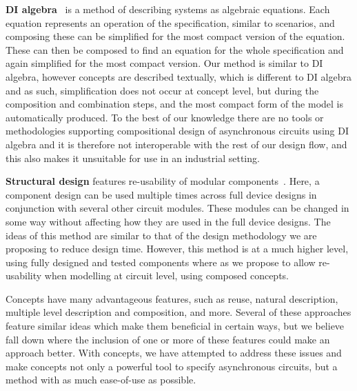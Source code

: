 \documentclass[british,compsoc]{IEEEtran}
\begin{document}
\textbf{DI algebra}~\cite{josephs1993overview} is a method of describing
systems as algebraic equations. Each equation represents an operation
of the specification, similar to scenarios, and composing these can
be simplified for the most compact version of the equation. These
can then be composed to find an equation for the whole specification
and again simplified for the most compact version. Our method is similar
to DI algebra, however concepts are described textually, which is
different to DI algebra and as such, simplification does not occur
at concept level, but during the composition and combination steps,
and the most compact form of the model is automatically produced.
To the best of our knowledge there are no tools or methodologies supporting
compositional design of asynchronous circuits using DI algebra and
it is therefore not interoperable with the rest of our design flow,
and this also makes it unsuitable for use in an industrial setting.

\textbf{Structural design} features re-usability of modular components~\cite{modular-circuit-design}.
Here, a component design can be used multiple times across full device
designs in conjunction with several other circuit modules. These modules
can be changed in some way without affecting how they are used in
the full device designs. The ideas of this method are similar to that
of the design methodology we are proposing to reduce design time.
However, this method is at a much higher level, using fully designed
and tested components where as we propose to allow re-usability when
modelling at circuit level, using composed concepts.

Concepts have many advantageous features, such as reuse, natural description, multiple level description and composition, and more.
Several of these approaches feature similar ideas which make them beneficial in certain ways,
but we believe fall down where the inclusion of one or more of these features could make an approach better. With concepts,
we have attempted to address these issues and make concepts not only a powerful tool to specify asynchronous circuits, but a method with as much ease-of-use as possible.

\end{document}
